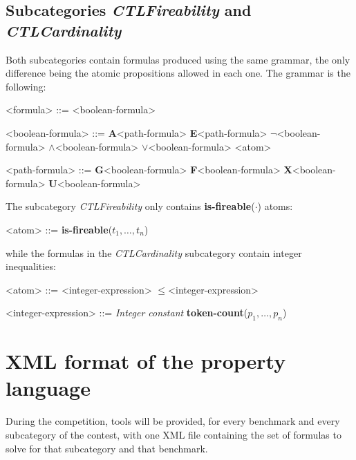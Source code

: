 \documentclass[10pt,english,a4paper]{article}
\newcommand\ctla             {\textbf{A}\xspace}
\newcommand\ctle             {\textbf{E}\xspace}
\newcommand\ltlf             {\textbf{F}\xspace}
\newcommand\ltlg             {\textbf{G}\xspace}
\newcommand\ltlx             {\textbf{X}\xspace}
\newcommand\ltlu             {\textbf{U}\xspace}
\newcommand\logicnot         {\boldmath$\lnot$\xspace}
\newcommand\logicand         {\boldmath$\land$\xspace}
\newcommand\logicor          {\boldmath$\lor$\xspace}
\newcommand\atomleq          {\boldmath$\leq$\xspace}
\newcommand\atomisfire[1]    {\textbf{is-fireable}(#1)}
\newcommand\atomtokenscnt[1] {\textbf{token-count}(#1)}
\newcommand\mysection[1]{\color{sectioncolor}\section{#1}\color{defaultcolor}}
\newcommand\mysubsection[1]{\color{sectioncolor}\subsection{#1}\color{defaultcolor}}
\begin{document}
\mysubsection{Subcategories \emph{CTLFireability} and \emph{CTLCardinality}}

Both subcategories contain formulas produced using the same grammar, the
only difference being the atomic propositions allowed in each one.
The grammar is the following:

\begin{grammar}
<formula> ::= <boolean-formula>

<boolean-formula> ::=
     \ctla <path-formula>
\alt \ctle <path-formula>
\alt \logicnot <boolean-formula>
 \logicand <boolean-formula>
 \logicor <boolean-formula>
\alt <atom>

<path-formula> ::=
     \ltlg <boolean-formula>
\alt \ltlf <boolean-formula>
\alt \ltlx <boolean-formula>
 \ltlu <boolean-formula>
\end{grammar}

The subcategory \emph{CTLFireability} only contains \atomisfire{$\cdot$}
atoms:

\begin{grammar}
<atom> ::= \atomisfire{$t_1, \ldots, t_n$}
\end{grammar}

while the formulas in the \emph{CTLCardinality} subcategory contain
integer inequalities:

\begin{grammar}
<atom> ::= <integer-expression> \atomleq <integer-expression>

<integer-expression> ::= \textit{Integer constant}
\alt \atomtokenscnt{$p_1, \ldots, p_n$}
\end{grammar}



\mysection{XML format of the property language}
\label{s:rng}

During the competition, tools will be provided, for every benchmark and
every subcategory of the contest, with one XML file containing the set of
formulas to solve for that subcategory and that benchmark.
\end{document}
